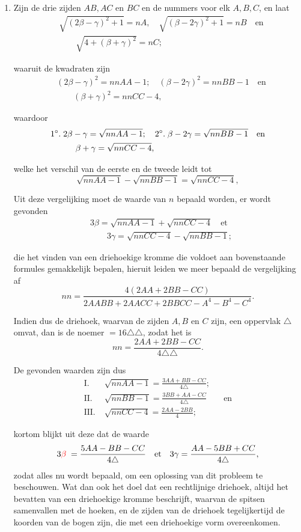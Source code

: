 \documentclass[10pt,a4paper]{article}
\newcommand{\switchenum}{\setcounter{enumi}{\arabic{enumi}-1}\switchcolumn}
\begin{document}
\begin{paracol}{2}
\begin{enumerate}[topsep=1px]
		\switchenum
		\item Zijn de drie zijden $AB, AC$ en $BC$ en de nummers voor elk $A, B, C$, en laat
		\begin{align*}
			&\sqrt{(2\beta - \gamma)^2+1} = nA, \quad \sqrt{(\beta-2\gamma)^2+1} = nB \quad \text{en}\\
			&\qquad \sqrt{4+(\beta + \gamma)^2}= nC;
		\end{align*}
		\par waaruit de kwadraten zijn
		\begin{align*}
			&(2\beta- \gamma)^2 = nnAA - 1; \quad (\beta-2\gamma )^2= nnBB-1\quad \text{en}\\
			&\qquad (\beta+\gamma)^2= nnCC-4,
		\end{align*}
		\par waardoor
		\begin{align*}
			&\text{1}\degree.\; 2\beta - \gamma = \sqrt{nnAA-1}; \quad \text{2}\degree.\; \beta - 2\gamma = \sqrt{nnBB-1}\quad \text{en}\\
			&\qquad \quad \beta + \gamma = \sqrt{nnCC-4},
		\end{align*}
		\par welke het verschil van de eerste en de tweede leidt tot
		\[
			\sqrt{nnAA-1}-\sqrt{nnBB-1} = \sqrt{nnCC-4},
		\]
		\par Uit deze vergelijking moet de waarde van $n$ bepaald worden, er wordt gevonden
		\begin{align*}
			&3\beta = \sqrt{nnAA-1}+\sqrt{nnCC-4} \quad \text{et}\\
			&\qquad 3\gamma = \sqrt{nnCC-4}-\sqrt{nnBB-1};
		\end{align*}
		\par die het vinden van een driehoekige kromme die voldoet aan bovenstaande formules gemakkelijk bepalen, hieruit leiden we meer bepaald de vergelijking af
		\[
			nn = \frac{4(2AA+2BB-CC)}{2AABB+2AACC+2BBCC-A^4-B^4-C^4}.
		\]
		\par Indien dus de driehoek, waarvan de zijden $A, B$ en $C$ zijn, een oppervlak $\triangle$ omvat, dan is de noemer $=16\triangle \triangle$, zodat het is 
		\[
			nn=\frac{2AA+2BB-CC}{4 \triangle \triangle}.
		\]
		\par De gevonden waarden zijn dus
		\begin{align*}
			\text{I}. \;& \sqrt{nnAA-1} = \frac{3AA+BB-CC}{4\triangle};\\
			\text{II}. \; & \sqrt{nnBB-1} = \frac{3BB+AA-CC}{4\triangle} \qquad \text{en}\\
			\text{III}. \;& \sqrt{nnCC-4} = \frac{2AA-2BB}{4};
		\end{align*}
		\par kortom blijkt uit deze dat de waarde
		\[
			3{\color{red}\beta}\; = \frac{5AA-BB-CC}{4\triangle} \quad \text{et} \quad 3\gamma = \frac{AA-5BB+CC}{4\triangle},
		\]
		zodat alles nu wordt bepaald, om een oplossing van dit probleem te beschouwen. Wat dan ook het doel dat een rechtlijnige driehoek, altijd het bevatten van een driehoekige kromme beschrijft, waarvan de spitsen samenvallen met de hoeken, en de zijden van de driehoek tegelijkertijd de koorden van de bogen zijn, die met een driehoekige vorm overeenkomen.
		

\end{enumerate}
\end{paracol}
\end{document}
